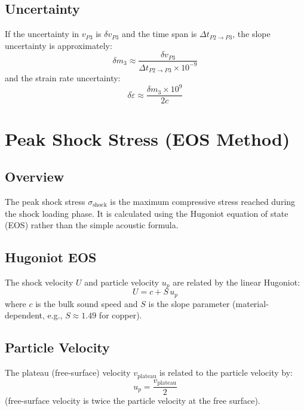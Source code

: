 \subsection{Uncertainty}
If the uncertainty in $v_{P3}$ is $\delta v_{P3}$ and the time span is $\Delta t_{P2 \to P3}$, the slope uncertainty is approximately:
\begin{equation}
\delta m_3 \approx \frac{\delta v_{P3}}{\Delta t_{P2 \to P3} \times 10^{-9}}
\end{equation}
and the strain rate uncertainty:
\begin{equation}
\delta\dot{\varepsilon} \approx \frac{\delta m_3 \times 10^9}{2c}
\end{equation}

\section{Peak Shock Stress (EOS Method)}

\subsection{Overview}
The peak shock stress $\sigma_{\text{shock}}$ is the maximum compressive stress reached during the shock loading phase. It is calculated using the Hugoniot equation of state (EOS) rather than the simple acoustic formula.

\subsection{Hugoniot EOS}
The shock velocity $U$ and particle velocity $u_p$ are related by the linear Hugoniot:
\begin{equation}
U = c + S \, u_p
\end{equation}
where $c$ is the bulk sound speed and $S$ is the slope parameter (material-dependent, e.g., $S \approx 1.49$ for copper).

\subsection{Particle Velocity}
The plateau (free-surface) velocity $v_{\text{plateau}}$ is related to the particle velocity by:
\begin{equation}
u_p = \frac{v_{\text{plateau}}}{2}
\end{equation}
(free-surface velocity is twice the particle velocity at the free surface).

